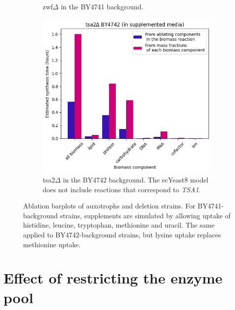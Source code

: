 \begin{figure}
\begin{subfigure}[htpb]{0.45\textwidth}
   \caption{
     zwf$\Delta$ in the BY4741 background.
   }
   \label{fig:model-ablation-zwf1}
  \end{subfigure}
  \begin{subfigure}[htpb]{0.45\textwidth}
   \centering
   \includegraphics[width=\textwidth]{ablation_tsa2}
   \caption{
     tsa2$\Delta$ in the BY4742 background.  The ecYeast8 model does not include reactions that correspond to \textit{TSA1}.
   }
   \label{fig:model-ablation-tsa2}
  \end{subfigure}
  \caption{
    Ablation barplots of auxotrophs and deletion strains.
    For BY4741-background strains, supplements are simulated by allowing uptake of histidine, leucine, tryptophan, methionine and uracil.
    The same applied to BY4742-background strains, but lysine uptake replaces methionine uptake.
  }
  \label{fig:model-ablation-strains}
\end{figure}

\section{Effect of restricting the enzyme pool}
\label{sec:model-pool}


